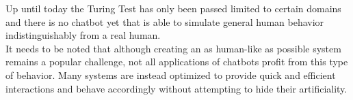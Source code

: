 Up until today the Turing Test has only been passed limited to certain domains and there is no chatbot yet that is able to simulate general human behavior indistinguishably from a real human.
\\
It needs to be noted that although creating an as human-like as possible system remains a popular challenge, not all applications of chatbots profit from this type of behavior. Many systems are instead optimized to provide quick and efficient interactions and behave accordingly without attempting to hide their artificiality.
